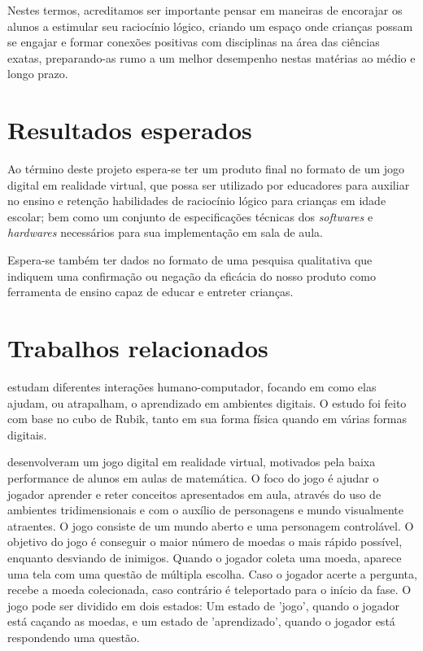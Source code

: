 Nestes termos, acreditamos ser importante pensar em maneiras de encorajar os alunos a estimular seu raciocínio lógico, criando um espaço onde crianças possam se engajar e formar conexões positivas com disciplinas na área das ciências exatas, preparando-as rumo a um melhor desempenho nestas matérias ao médio e longo prazo.

\section{Resultados esperados}\label{sec-resultados-esperados}

Ao término deste projeto espera-se ter um produto final no formato de um jogo digital em realidade virtual, que possa ser utilizado por educadores para auxiliar no ensino e retenção habilidades de raciocínio lógico para crianças em idade escolar; bem como um conjunto de especificações técnicas dos \textit{softwares} e \textit{hardwares} necessários para sua implementação em sala de aula.

Espera-se também ter dados no formato de uma pesquisa qualitativa que indiquem uma confirmação ou negação da eficácia do nosso produto como ferramenta de ensino capaz de educar e entreter crianças.

\section{Trabalhos relacionados}\label{sec-trabalhos-relacionados}

\cite{Tabuti:2010:analise} estudam diferentes interações humano-computador, 
focando em como elas ajudam, ou atrapalham, o aprendizado em ambientes 
digitais. O estudo foi feito com base no cubo de Rubik, tanto em sua 
forma física quando em várias formas digitais.

\cite{SBGames:2015:RVAM} desenvolveram um jogo digital em realidade 
virtual, motivados pela baixa performance de alunos em aulas de matemática. 
O foco do jogo é ajudar o jogador aprender e reter conceitos apresentados 
em aula, através do uso de ambientes tridimensionais e com o auxílio de 
personagens e mundo visualmente atraentes. O jogo consiste de um mundo 
aberto e uma personagem controlável. O objetivo do jogo é conseguir o 
maior número de moedas o mais rápido possível, enquanto desviando de 
inimigos. Quando o jogador coleta uma moeda, aparece uma tela com uma questão 
de múltipla escolha. Caso o jogador acerte a pergunta, recebe a moeda 
colecionada, caso contrário é teleportado para o início da fase. O jogo pode 
ser dividido em dois estados: Um estado de 'jogo', quando o jogador está 
caçando as moedas, e um estado de 'aprendizado', quando o jogador está 
respondendo uma questão.

